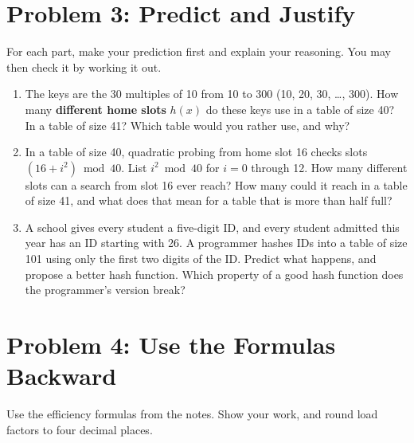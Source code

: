 \documentclass[11pt]{article}
\begin{document}
\section{Problem 3: Predict and Justify}

For each part, make your prediction first and explain your reasoning. You may then check it by
working it out.

\begin{enumerate}[label=(\alph*), leftmargin=1.8em]
  \item The keys are the 30 multiples of 10 from 10 to 300 (10, 20, 30, \dots, 300). How many
    \textbf{different home slots} $h(x)$ do these keys use in a table of size 40? In a table
    of size 41? Which table would you rather use, and why?
  \item In a table of size 40, quadratic probing from home slot 16 checks slots
    $(16 + i^2) \bmod 40$. List $i^2 \bmod 40$ for $i = 0$ through 12. How many different slots
    can a search from slot 16 ever reach? How many could it reach in a table of size 41, and
    what does that mean for a table that is more than half full?
  \item A school gives every student a five-digit ID, and every student admitted this year
    has an ID starting with 26. A programmer hashes IDs into a table of size 101 using only the
    first two digits of the ID. Predict what happens, and propose a better hash function. Which
    property of a good hash function does the programmer's version break?
\end{enumerate}

\section{Problem 4: Use the Formulas Backward}

Use the efficiency formulas from the notes. Show your work, and round load factors to four
decimal places.
\end{document}
